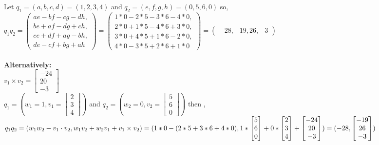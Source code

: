\documentclass{article}
\begin{document}
Let $q_1=(a,b,c,d)=(1,2,3,4)$ and $q_2=(e,f,g,h)=(0,5,6,0)$ so,\\
$q_1q_2=\begin{pmatrix}
ae-bf-cg-dh,\\
be+af-dg+ch,\\
ce+df+ag-bh,\\ 
de-cf+bg+ah
\end{pmatrix}=\begin{pmatrix}
1*0-2*5-3*6-4*0,\\
2*0+1*5-4*6+3*0,\\
3*0+4*5+1*6-2*0,\\
4*0-3*5+2*6+1*0
\end{pmatrix}=\begin{pmatrix}
-28,-19,26,-3
\end{pmatrix}$\\\\
\textbf{Alternatively:}\\
$v_1 \times v_2 = \begin{bmatrix}
-24\\
20\\
-3
\end{bmatrix}$\\
$q_1 = (w_1=1, v_1=\begin{bmatrix}
2\\
3\\
4
\end{bmatrix})$  and $q_2 = (w_2=0, v_2=\begin{bmatrix}
5\\
6\\
0
\end{bmatrix})$ then ,\\ $q_1q_2=(w_1w_2 - v_1 \cdot v_2, w_1v_2 + w_2v_1 + v_1 \times v_2)=\\
(1*0-(2*5+3*6+4*0),1*\begin{bmatrix}
5\\
6\\
0
\end{bmatrix}+0*\begin{bmatrix}
2\\
3\\
4
\end{bmatrix}+\begin{bmatrix}
-24\\
20\\
-3
\end{bmatrix} )=(-28, \begin{bmatrix}
-19\\
26\\
-3
\end{bmatrix})$\newpage
\end{document}
